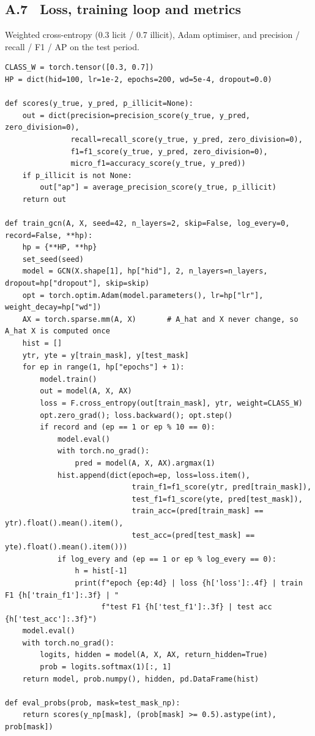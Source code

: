 \subsection*{A.7 \ Loss, training loop and metrics}
Weighted cross-entropy (0.3 licit / 0.7 illicit), Adam optimiser, and precision / recall / F1 / AP on the test period.
\begin{lstlisting}
CLASS_W = torch.tensor([0.3, 0.7])
HP = dict(hid=100, lr=1e-2, epochs=200, wd=5e-4, dropout=0.0)

def scores(y_true, y_pred, p_illicit=None):
    out = dict(precision=precision_score(y_true, y_pred, zero_division=0),
               recall=recall_score(y_true, y_pred, zero_division=0),
               f1=f1_score(y_true, y_pred, zero_division=0),
               micro_f1=accuracy_score(y_true, y_pred))
    if p_illicit is not None:
        out["ap"] = average_precision_score(y_true, p_illicit)
    return out

def train_gcn(A, X, seed=42, n_layers=2, skip=False, log_every=0, record=False, **hp):
    hp = {**HP, **hp}
    set_seed(seed)
    model = GCN(X.shape[1], hp["hid"], 2, n_layers=n_layers, dropout=hp["dropout"], skip=skip)
    opt = torch.optim.Adam(model.parameters(), lr=hp["lr"], weight_decay=hp["wd"])
    AX = torch.sparse.mm(A, X)       # A_hat and X never change, so A_hat X is computed once
    hist = []
    ytr, yte = y[train_mask], y[test_mask]
    for ep in range(1, hp["epochs"] + 1):
        model.train()
        out = model(A, X, AX)
        loss = F.cross_entropy(out[train_mask], ytr, weight=CLASS_W)
        opt.zero_grad(); loss.backward(); opt.step()
        if record and (ep == 1 or ep % 10 == 0):
            model.eval()
            with torch.no_grad():
                pred = model(A, X, AX).argmax(1)
            hist.append(dict(epoch=ep, loss=loss.item(),
                             train_f1=f1_score(ytr, pred[train_mask]),
                             test_f1=f1_score(yte, pred[test_mask]),
                             train_acc=(pred[train_mask] == ytr).float().mean().item(),
                             test_acc=(pred[test_mask] == yte).float().mean().item()))
            if log_every and (ep == 1 or ep % log_every == 0):
                h = hist[-1]
                print(f"epoch {ep:4d} | loss {h['loss']:.4f} | train F1 {h['train_f1']:.3f} | "
                      f"test F1 {h['test_f1']:.3f} | test acc {h['test_acc']:.3f}")
    model.eval()
    with torch.no_grad():
        logits, hidden = model(A, X, AX, return_hidden=True)
        prob = logits.softmax(1)[:, 1]
    return model, prob.numpy(), hidden, pd.DataFrame(hist)

def eval_probs(prob, mask=test_mask_np):
    return scores(y_np[mask], (prob[mask] >= 0.5).astype(int), prob[mask])
\end{lstlisting}


